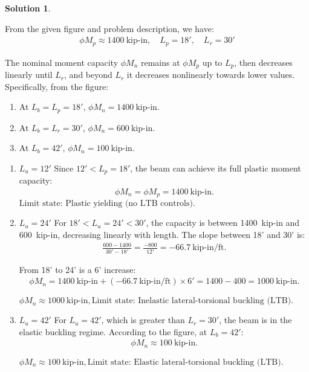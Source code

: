 \documentclass[12pt]{article}
\theoremstyle{definition} %
\newtheorem{solution}{Solution}
\theoremstyle{plain} %
\begin{document}
\begin{solution}
\begin{enumerate}
From the given figure and problem description, we have:
\begin{align}
\phi M_p \approx 1400~\text{kip-in}, \quad L_p = 18' , \quad L_r = 30'
\end{align}

The nominal moment capacity $\phi M_n$ remains at $\phi M_p$ up to $L_p$, then decreases linearly until $L_r$, and beyond $L_r$ it decreases nonlinearly towards lower values. Specifically, from the figure:
\begin{enumerate}
    \item At $L_b = L_p = 18'$, $\phi M_n = 1400~\text{kip-in}$.
    \item At $L_b = L_r = 30'$, $\phi M_n = 600~\text{kip-in}$.
    \item At $L_b = 42'$, $\phi M_n = 100~\text{kip-in}$.
\end{enumerate}
\begin{enumerate}
    \item  $L_u = 12'$
Since $12' < L_p = 18'$, the beam can achieve its full plastic moment capacity:
\begin{align}
\phi M_n = \phi M_p = 1400~\text{kip-in}.
\end{align}
$\boxed{\text{Limit state: Plastic yielding (no LTB controls).}}$

\item $L_u = 24'$
For $18' < L_u = 24' < 30'$, the capacity is between 1400~kip-in and 600~kip-in, decreasing linearly with length. The slope between 18' and 30' is:
\begin{align}
\frac{600 - 1400}{30' - 18'} = \frac{-800}{12'} = -66.7~\text{kip-in/ft}.
\end{align}

From 18' to 24' is a 6' increase:
\begin{align}
\phi M_n = 1400~\text{kip-in} + (-66.7~\text{kip-in/ft}) \times 6' = 1400 - 400 = 1000~\text{kip-in}.
\end{align}

$\boxed{\phi M_n \approx 1000~\text{kip-in}, \text{Limit state: Inelastic lateral-torsional buckling (LTB).}}$

\item $L_u = 42'$
For $L_u = 42'$, which is greater than $L_r = 30'$, the beam is in the elastic buckling regime. According to the figure, at $L_b = 42'$:
\begin{align}
\phi M_n \approx 100~\text{kip-in}.
\end{align}

$\boxed{\phi M_n \approx 100~\text{kip-in}, \text{Limit state: Elastic lateral-torsional buckling (LTB).}}$


\end{enumerate}
\end{enumerate}
\end{solution}
\end{document}
